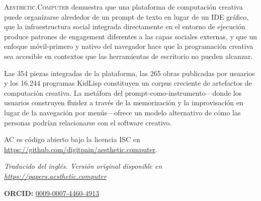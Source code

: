 \documentclass[10pt,letterpaper,twocolumn]{article}
\newcommand{\ac}{\textsc{Aesthetic.Computer}}
\begin{document}
\ac{} demuestra que una plataforma de computación creativa puede organizarse alrededor de un prompt de texto en lugar de un IDE gráfico, que la infraestructura social integrada directamente en el entorno de ejecución produce patrones de engagement diferentes a las capas sociales externas, y que un enfoque móvil-primero y nativo del navegador hace que la programación creativa sea accesible en contextos que las herramientas de escritorio no pueden alcanzar.

Las 354 piezas integradas de la plataforma, las 265 obras publicadas por usuarios y los 16.244 programas KidLisp constituyen un corpus creciente de artefactos de computación creativa. La metáfora del prompt-como-instrumento---donde los usuarios construyen fluidez a través de la memorización y la improvisación en lugar de la navegación por menús---ofrece un modelo alternativo de cómo las personas podrían relacionarse con el software creativo.

AC es código abierto bajo la licencia ISC en \url{https://github.com/digitpain/aesthetic.computer}.

\vspace{0.5em}
\noindent\textit{Traducido del inglés. Versión original disponible en \url{https://papers.aesthetic.computer}}

\vspace{0.5em}
\noindent\textbf{ORCID:} \href{https://orcid.org/0009-0007-4460-4913}{0009-0007-4460-4913}




\end{document}
